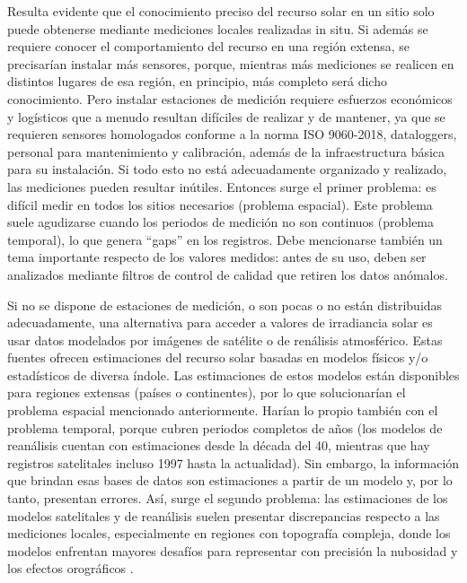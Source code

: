 Resulta evidente que el conocimiento preciso del recurso solar en un sitio solo puede obtenerse mediante mediciones locales realizadas in situ. Si además se requiere conocer el comportamiento del recurso en una región extensa, se precisarían instalar más sensores, porque, mientras más mediciones se realicen en distintos lugares de esa región, en principio, más completo será dicho conocimiento. Pero instalar estaciones de medición requiere esfuerzos económicos y logísticos que a menudo resultan difíciles de realizar y de mantener, ya que se requieren sensores homologados conforme a la norma ISO 9060-2018, dataloggers, personal para mantenimiento y calibración, además de la infraestructura básica para su instalación. Si todo esto no está adecuadamente organizado y realizado, las mediciones pueden resultar inútiles. Entonces surge el primer problema: es difícil medir en todos los sitios necesarios (problema espacial). Este problema suele agudizarse cuando los periodos de medición no son continuos (problema temporal), lo que genera “gaps” en los registros. Debe mencionarse también un tema importante respecto de los valores medidos: antes de su uso, deben ser analizados mediante filtros de control de calidad que retiren los datos anómalos.


Si no se dispone de estaciones de medición, o son pocas o no están distribuidas adecuadamente, una alternativa para acceder a valores de irradiancia solar es usar datos modelados por imágenes de satélite o de renálisis atmosférico. Estas fuentes ofrecen estimaciones del recurso solar basadas en modelos físicos y/o estadísticos de diversa índole. Las estimaciones de estos modelos están disponibles para regiones extensas (países o continentes), por lo que solucionarían el problema espacial mencionado anteriormente. Harían lo propio también con el problema temporal, porque cubren periodos completos de años (los modelos de reanálisis cuentan con estimaciones desde la década del 40, mientras que hay registros satelitales incluso 1997 hasta la actualidad). Sin embargo, la información que brindan esas bases de datos son estimaciones a partir de un modelo y, por lo tanto, presentan errores. Así, surge el segundo problema: las estimaciones de los modelos satelitales y de reanálisis suelen presentar discrepancias respecto a las mediciones locales, especialmente en regiones con topografía compleja, donde los modelos enfrentan mayores desafíos para representar con precisión la nubosidad y los efectos orográficos \citep{Perez2002, Greuell2013, Sengupta2024}.


